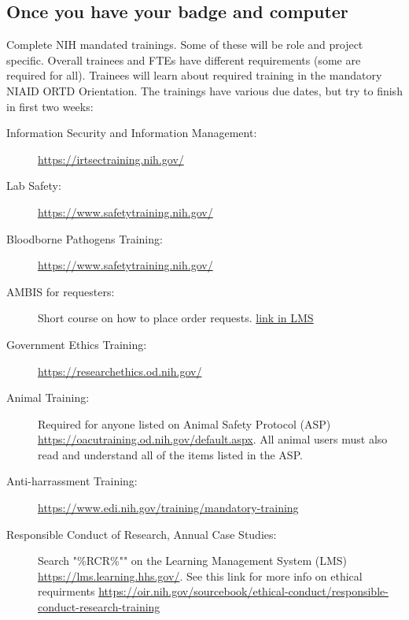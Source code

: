 \documentclass[10pt, letterpaper, twocolumn]{article} %
\begin{document}
\subsection{Once you have your badge and computer}
Complete NIH mandated trainings. Some of these will be role and project specific. Overall trainees and FTEs have different requirements (some are required for all).  Trainees will learn about required training in the mandatory NIAID ORTD Orientation.
The trainings have various due dates, but try to finish in first two weeks:
\begin{description}
\item[Information Security and Information Management:]\href{https://irtsectraining.nih.gov/}{https://irtsectraining.nih.gov/}
\item[Lab Safety:]\href{https://www.safetytraining.nih.gov/}{https://www.safetytraining.nih.gov/}
\item[Bloodborne Pathogens Training:]\href{https://www.safetytraining.nih.gov/}{https://www.safetytraining.nih.gov/}
\item[AMBIS for requesters:] Short course on how to place order requests. \href{https://lms.learning.hhs.gov/Saba/Web_wdk/Main/learning/learningOfferingDetails.rdf}{link in LMS}
\item[Government Ethics Training:]\href{https://researchethics.od.nih.gov/}{https://researchethics.od.nih.gov/}
\item[Animal Training:]Required for anyone listed on Animal Safety Protocol (ASP) \href{https://oacutraining.od.nih.gov/default.aspx}{https://oacutraining.od.nih.gov/default.aspx}. All animal users must also read and understand all of the items listed in the ASP.
\item[Anti-harrassment Training:]\href{https://www.edi.nih.gov/training/mandatory-training}{https://www.edi.nih.gov/training/mandatory-training}
\item[Responsible Conduct of Research, Annual Case Studies:] Search  "\%RCR\%"" on the Learning Management System (LMS) \href{https://lms.learning.hhs.gov/}{https://lms.learning.hhs.gov/}. See this link for more info on ethical requirments \href{https://oir.nih.gov/sourcebook/ethical-conduct/responsible-conduct-research-training}{https://oir.nih.gov/sourcebook/ethical-conduct/responsible-conduct-research-training}
\end{description}
\end{document}

